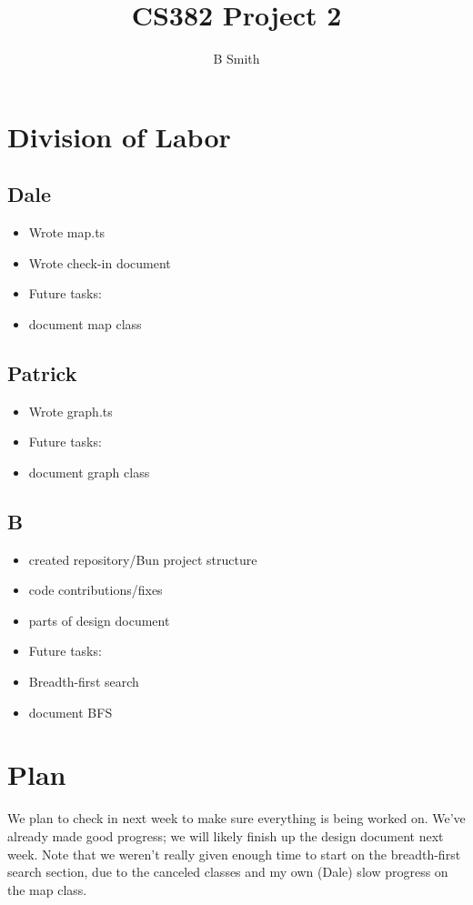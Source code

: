 \documentclass{homework}
\title{CS382 Project 2}
\author{B Smith}
\begin{document}
\maketitle
\tableofcontents

    \section{Division of Labor}
    \subsection{Dale}
    \begin{itemize}
        \item Wrote map.ts
        \item Wrote check-in document
        \item Future tasks:
        \item document map class
    \end{itemize}
    \subsection{Patrick}
    \begin{itemize}
        \item Wrote graph.ts
        \item Future tasks:
        \item document graph class
    \end{itemize}
    \subsection{B}
    \begin{itemize}
        \item created repository/Bun project structure
        \item code contributions/fixes
        \item parts of design document
        \item Future tasks:
        \item Breadth-first search
        \item document BFS
    \end{itemize}

    \section{Plan}
    We plan to check in next week to make sure everything is being worked on.
    We've already made good progress; we will likely finish up the design document next week.
    Note that we weren't really given enough time to start on the breadth-first search section, due to the canceled classes and my own (Dale) slow progress on the map class.
\end{document}
